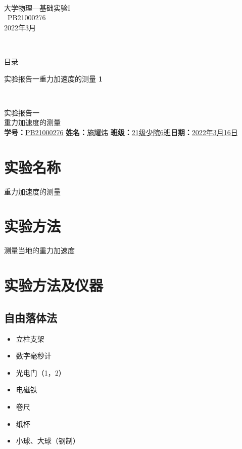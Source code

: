 \documentclass{article}
\date{2022年3月}
\def\kong{\hspace*{2em}}
\begin{document}
\thispagestyle{empty}
\hspace*{2em}
\\[140pt]

\begin{center}
{\heiti \Huge 大学物理—基础实验I}
\\[14pt]
{\Large {}\ PB21000276}
\\[10pt]
{\Large 2022年3月}
\end{center}

\clearpage
\thispagestyle{empty}
\kong
\newpage
\thispagestyle{empty}
\kong
\\[12pt]
\begin{center}
	{\huge \heiti 目录}\\[26pt]
\end{center}
{\large {\heiti 实验报告一}\quad 重力加速度的测量 \hfill \textbf{1}}


\newpage
\kong
\thispagestyle{empty}
\newpage
\setcounter{page}{1}
\thispagestyle{empty}
\kong
\\[10pt]
\begin{center}
	{\LARGE \heiti 实验报告一}\\[6pt]
  {\LARGE \heiti 重力加速度的测量}\\[12pt]
	\textbf{学号：}\underline{\kaishu PB21000276} \qquad \textbf{姓名：}\underline{\kaishu 施耀炜} \qquad \textbf{班级：}\underline{\kaishu 21级少院6班}\qquad \textbf{日期：}\underline{2022年3月16日}\\[12pt]
\end{center}
\section{实验名称}
\kong 重力加速度的测量
\section{实验方法}
\kong 测量当地的重力加速度
\section{实验方法及仪器}
	\subsection{自由落体法}
		\begin{itemize}[noitemsep]
			\item 立柱支架
			\item 数字毫秒计
			\item 光电门（1，2）
			\item 电磁铁
			\item 卷尺
			\item 纸杯
			\item 小球、大球（钢制）
		\end{itemize}
\end{document}
